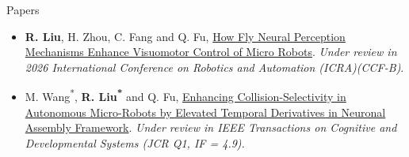 \documentclass{resume} %
\begin{document}
\begin{rSection}{Papers}
\begin{itemize}[left = -0.22in]
	\item \textbf{R. Liu}, H. Zhou, C. Fang and Q. Fu, \href{https://arxiv.org/pdf/2509.13827}{How Fly Neural Perception Mechanisms Enhance Visuomotor Control of Micro Robots}. 
	\textit{Under review in 2026 International Conference on Robotics and Automation (ICRA)(CCF-B)}.
		
	\item M. Wang\textsuperscript{*}, \textbf{R. Liu\textsuperscript{*}} and Q. Fu,
	\href{https://ryannnice.github.io/assets/TCDS-2025-0806_Proof_hi.pdf}{Enhancing Collision-Selectivity in Autonomous Micro-Robots by Elevated Temporal Derivatives in Neuronal Assembly Framework}. 
	\textit{Under review in IEEE Transactions on Cognitive and Developmental Systems (JCR Q1, IF = 4.9).}

\end{itemize}
\end{rSection}










\end{document}
